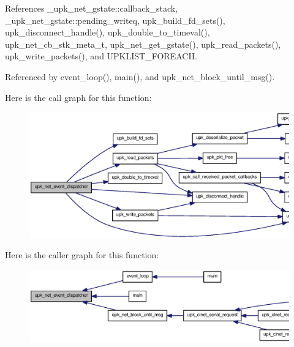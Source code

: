 References \_\-upk\_\-net\_\-gstate::callback\_\-stack, \_\-upk\_\-net\_\-gstate::pending\_\-writeq, upk\_\-build\_\-fd\_\-sets(), upk\_\-disconnect\_\-handle(), upk\_\-double\_\-to\_\-timeval(), upk\_\-net\_\-cb\_\-stk\_\-meta\_\-t, upk\_\-net\_\-get\_\-gstate(), upk\_\-read\_\-packets(), upk\_\-write\_\-packets(), and UPKLIST\_\-FOREACH.



Referenced by event\_\-loop(), main(), and upk\_\-net\_\-block\_\-until\_\-msg().



Here is the call graph for this function:\nopagebreak
\begin{figure}[H]
\begin{center}
\leavevmode
\includegraphics[width=400pt]{group__upk__network_ga903e995b09efa15de0a8088a0005c42b_cgraph}
\end{center}
\end{figure}




Here is the caller graph for this function:
\nopagebreak
\begin{figure}[H]
\begin{center}
\leavevmode
\includegraphics[width=400pt]{group__upk__network_ga903e995b09efa15de0a8088a0005c42b_icgraph}
\end{center}
\end{figure}


